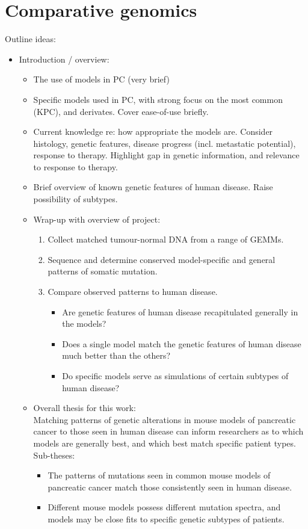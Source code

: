 \documentclass[thesis.tex]{subfiles}
\begin{document}
\chapter{Comparative genomics}
\label{ch:comparative}

Outline ideas:
\begin{itemize}
  \item Introduction / overview:
  \begin{itemize}
    \item The use of models in PC (very brief)
    \item Specific models used in PC, with strong focus on the most common (KPC), and derivates.  Cover ease-of-use briefly.
    \item Current knowledge re: how appropriate the models are.  Consider histology, genetic features, disease progress (incl. metastatic potential), response to therapy.  Highlight gap in genetic information, and relevance to response to therapy.
    \item Brief overview of known genetic features of human disease.  Raise possibility of subtypes.
    \item Wrap-up with overview of project:
    \begin{enumerate}
      \item Collect matched tumour-normal DNA from a range of GEMMs.
      \item Sequence and determine conserved model-specific and general patterns of somatic mutation.
      \item Compare observed patterns to human disease.
      \begin{itemize}
        \item Are genetic features of human disease recapitulated generally in the models?
        \item Does a single model match the genetic features of human disease much better than the others?
        \item Do specific models serve as simulations of certain subtypes of human disease?
      \end{itemize}
    \end{enumerate}
    \item Overall thesis for this work: \\
    Matching patterns of genetic alterations in mouse models of pancreatic cancer to those seen in human disease can inform researchers as to which models are generally best, and which best match specific patient types. \\
    Sub-theses:
    \begin{itemize}
      \item The patterns of mutations seen in common mouse models of pancreatic cancer match those consistently seen in human disease.
      \item Different mouse models possess different mutation spectra, and models may be close fits to specific genetic subtypes of patients.
    \end{itemize}
  \end{itemize}
  

\end{itemize}
\end{document}
